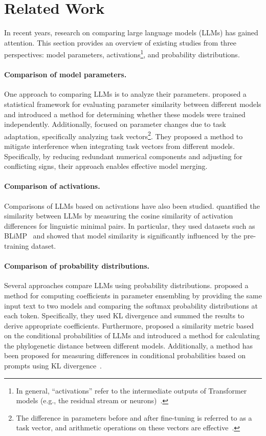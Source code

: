 \section{Related Work}
\label{sec:related-work}
In recent years, research on comparing large language models (LLMs) has gained attention.  
This section provides an overview of existing studies from three perspectives: model parameters, activations\footnote{In general, ``activations'' refer to the intermediate outputs of Transformer models (e.g., the residual stream or neurons)~\cite{bereska2024mechanistic}.}, and probability distributions.

\paragraph{Comparison of model parameters.}
One approach to comparing LLMs is to analyze their parameters.
\citet{zhu2025independence} proposed a statistical framework for evaluating parameter similarity between different models and introduced a method for determining whether these models were trained independently. 
Additionally, \citet{NEURIPS2023_1644c9af} focused on parameter changes due to task adaptation, specifically analyzing task vectors\footnote{The difference in parameters before and after fine-tuning is referred to as a task vector, and arithmetic operations on these vectors are effective~\cite{ilharco2023editing}.}. They proposed a method to mitigate interference when integrating task vectors from different models. Specifically, by reducing redundant numerical components and adjusting for conflicting signs, their approach enables effective model merging.

\paragraph{Comparison of activations.}
Comparisons of LLMs based on activations have also been studied.  
\citet{zhou-etal-2025-linguistic} quantified the similarity between LLMs by measuring the cosine similarity of activation differences for linguistic minimal pairs.
In particular, they used datasets such as BLiMP~\cite{10.1162/tacl_a_00321} and showed that model similarity is significantly influenced by the pre-training dataset.

\paragraph{Comparison of probability distributions.}
Several approaches compare LLMs using probability distributions.
\citet{lv-etal-2023-parameter} proposed a method for computing coefficients in parameter ensembling by providing the same input text to two models and comparing the softmax probability distributions at each token. 
Specifically, they used KL divergence and summed the results to derive appropriate coefficients.
Furthermore, \citet{yax2025phylolm} proposed a similarity metric based on the conditional probabilities of LLMs and introduced a method for calculating the phylogenetic distance between different models. 
 Additionally, a method has been proposed for measuring differences in conditional probabilities based on prompts using KL divergence~\cite{melamed-etal-2024-prompts}.